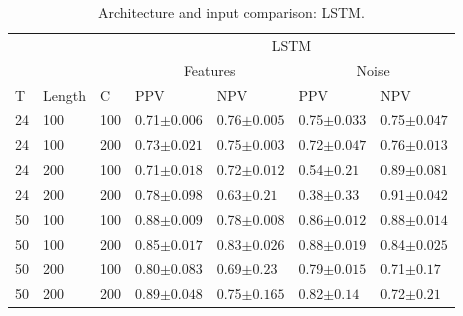 \begin{table}
  \setlength{\tabcolsep}{8pt}
\centering
\caption{Architecture and input comparison: LSTM.}
\label{table-lstm}
\begin{tabular}{|lll|ll|ll|} 
\hline
   &        &     & \multicolumn{4}{c|}{LSTM}                                                                      \\ 
\cline{4-7}
   &        &     & \multicolumn{2}{c|}{Features}                           & \multicolumn{2}{c|}{Noise}           \\
T  & Length & C   & PPV                                  & NPV              & PPV              & NPV               \\ 
\hline
24 & 100    & 100 & \multicolumn{1}{r}{0.71$\pm 0.006$ } & 0.76$\pm 0.005$  & 0.75$\pm 0.033$  & 0.75$\pm 0.047$   \\
24 & 100    & 200 & \multicolumn{1}{r}{0.73$\pm 0.021$ } & 0.75$\pm 0.003$  & 0.72$\pm 0.047$  & 0.76$\pm 0.013$   \\
24 & 200    & 100 & 0.71$\pm 0.018$                      & 0.72$\pm 0.012$  & 0.54$\pm 0.21$   & 0.89$\pm 0.081$   \\
24 & 200    & 200 & \multicolumn{1}{r}{0.78$\pm 0.098$ } & 0.63$\pm 0.21$   & 0.38$\pm 0.33$   & 0.91$\pm 0.042$   \\
50 & 100    & 100 & \multicolumn{1}{r}{0.88$\pm 0.009$ } & 0.78$\pm 0.008$  & 0.86$\pm 0.012$  & 0.88$\pm 0.014$   \\
50 & 100    & 200 & 0.85$\pm 0.017$                      & 0.83$\pm 0.026$  & 0.88$\pm 0.019$  & 0.84$\pm 0.025$   \\
50 & 200    & 100 & 0.80$\pm 0.083$                      & 0.69$\pm 0.23$   & 0.79$\pm 0.015$  & 0.71$\pm 0.17$    \\
50 & 200    & 200 & 0.89$\pm 0.048$                      & 0.75$\pm 0.165$  & 0.82$\pm 0.14$   & 0.72$\pm 0.21$    \\
\hline
\end{tabular}
\end{table}


